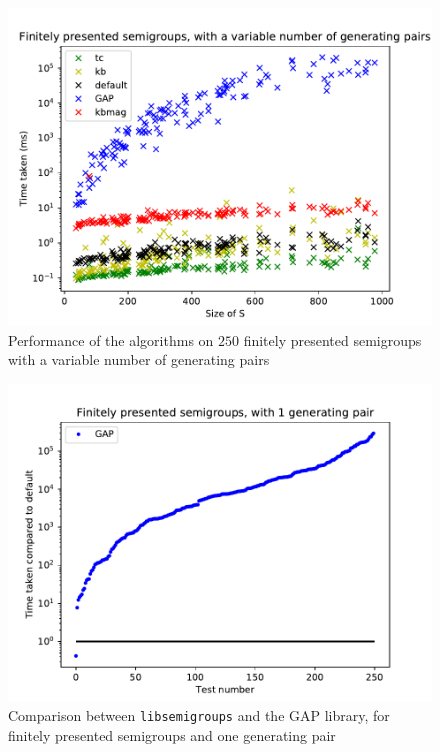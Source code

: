 \begin{figure}[h]
  \centering
  \includegraphics[width=\textwidth]{pics/ch-pairs/bench-fp-vp-times}
  \caption[Benchmark: all algorithms, finitely presented, $n$ pairs]
  {Performance of the algorithms on $250$ finitely presented semigroups
    with a variable number of generating pairs}
  \label{fig:bench-fp-vp-times}
\end{figure}

\begin{figure}[h]
  \centering
  \includegraphics[width=\textwidth]{pics/ch-pairs/bench-fp-1p-gap}
  \caption[Benchmark: GAP/\texttt{libsemigroups}, finitely presented, 1 pair]
  {Comparison between \texttt{libsemigroups} and the GAP library, for
    finitely presented semigroups and one generating pair}
  \label{fig:bench-fp-1p-gap}
\end{figure}

